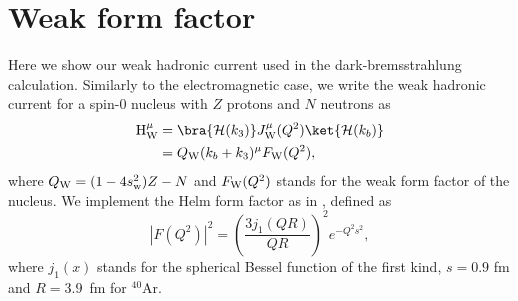 \section{Weak form factor}
\label{app:formfactors}

Here we show our weak hadronic current used in the dark-bremsstrahlung calculation. Similarly to the electromagnetic case, we write the weak hadronic current for a spin-0 nucleus with $Z$ protons and $N$ neutrons as
%
\begin{align}
 {\rm H}_{\rm W}^\mu &= \bra{\mathcal{H}(k_3)} J^\mu_{\rm W} (Q^2) \ket{\mathcal{H}(k_b)} \nonumber\\&= Q_{\rm W} (k_b+k_3)^\mu F_{\rm W}(Q^2),
\end{align}
where $Q_{\rm W} = (1-4 s_{\rm w}^2)Z - N$ and $F_{\rm W}(Q^2)$ stands for the weak form factor of the nucleus. We implement the Helm form factor as in \cite{Duda:2006uk}, defined as  
\begin{equation}
|F(Q^2)|^2 = \left( \frac{3 j_1(QR)}{QR}\right)^2 e^{-Q^2 s^2},
\end{equation}
where $j_1 (x)$ stands for the spherical Bessel function of the first kind, $s = 0.9$ fm and $R = 3.9$~fm for $^{40}$Ar.
